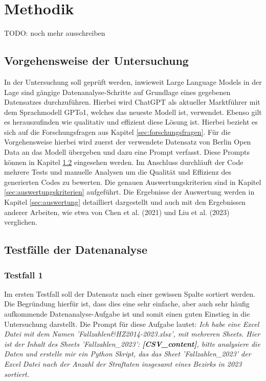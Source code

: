\documentclass[11pt,a4paper]{article}
\begin{document}
\section{Methodik}
\label{sec:methodik}
TODO: noch mehr ausschreiben

\subsection{Vorgehensweise der Untersuchung}
    In der Untersuchung soll geprüft werden, inwieweit Large Language Models in der Lage sind gängige Datenanalyse-Schritte auf Grundlage eines gegebenen Datensatzes durchzuführen. Hierbei wird ChatGPT als aktueller Marktführer mit dem Sprachmodell GPTo1, welches das neueste Modell ist, verwendet. Ebenso gilt es herauszufinden wie qualitativ und effizient diese Lösung ist. Hierbei bezieht es sich auf die Forschungsfragen aus Kapitel \ref{sec:forschungsfragen}.
    Für die Vorgehensweise hierbei wird zuerst der verwendete Datensatz von Berlin Open Data an das Modell übergeben und dazu eine Prompt verfasst. Diese Prompts können in Kapitel \ref{sec:testfaelle} eingesehen werden.
    Im Anschluss durchläuft der Code mehrere Tests und manuelle Analysen um die Qualität und Effizienz des generierten Codes zu bewerten. Die genauen Auswertungskriterien sind in Kapitel \ref{sec:auswertungskriterien} aufgeführt.
    Die Ergebnisse der Auswertung werden in Kapitel \ref{sec:auswertung} detailliert dargestellt und auch mit den Ergebnissen anderer Arbeiten, wie etwa von Chen et al. (2021)\cite{chen2021evaluatinglargelanguagemodels} und Liu et al. (2023)\cite{NEURIPS2023_43e9d647} verglichen.

\subsection{Testfälle der Datenanalyse}
\label{sec:testfaelle}
\subsubsection{Testfall 1}
    Im ersten Testfall soll der Datensatz nach einer gewissen Spalte sortiert werden. Die Begründung hierfür ist, dass dies eine sehr einfache, aber auch sehr häufig aufkommende Datenanalyse-Aufgabe ist und somit einen guten Einstieg in die Untersuchung darstellt. Die Prompt für diese Aufgabe lautet: \emph{Ich habe eine Excel Datei mit dem Namen 'Fallzahlen\&HZ2014-2023.xlsx', mit mehreren Sheets. Hier ist der Inhalt des Sheets 'Fallzahlen\_2023': \textbf{[CSV\_content]}, bitte analysiere die Daten und erstelle mir ein Python Skript, das das Sheet 'Fallzahlen\_2023' der Excel Datei nach der Anzahl der Straftaten insgesamt eines Bezirks in 2023 sortiert.}
\end{document}
